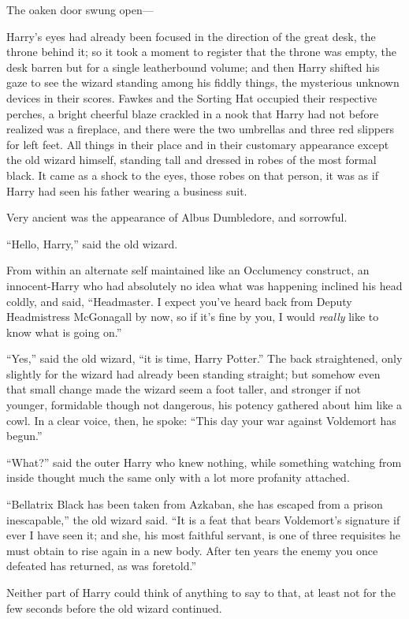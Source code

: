 The oaken door swung open—

Harry’s eyes had already been focused in the direction of the great desk, the throne behind it; so it took a moment to register that the throne was empty, the desk barren but for a single leatherbound volume; and then Harry shifted his gaze to see the wizard standing among his fiddly things, the mysterious unknown devices in their scores. Fawkes and the Sorting Hat occupied their respective perches, a bright cheerful blaze crackled in a nook that Harry had not before realized was a fireplace, and there were the two umbrellas and three red slippers for left feet. All things in their place and in their customary appearance except the old wizard himself, standing tall and dressed in robes of the most formal black. It came as a shock to the eyes, those robes on that person, it was as if Harry had seen his father wearing a business suit.

Very ancient was the appearance of Albus Dumbledore, and sorrowful.

“Hello, Harry,” said the old wizard.

From within an alternate self maintained like an Occlumency construct, an innocent-Harry who had absolutely no idea what was happening inclined his head coldly, and said, “Headmaster. I expect you’ve heard back from Deputy Headmistress McGonagall by now, so if it’s fine by you, I would \emph{really} like to know what is going on.”

“Yes,” said the old wizard, “it is time, Harry Potter.” The back straightened, only slightly for the wizard had already been standing straight; but somehow even that small change made the wizard seem a foot taller, and stronger if not younger, formidable though not dangerous, his potency gathered about him like a cowl. In a clear voice, then, he spoke: “This day your war against Voldemort has begun.”

“What?” said the outer Harry who knew nothing, while something watching from inside thought much the same only with a lot more profanity attached.

“Bellatrix Black has been taken from Azkaban, she has escaped from a prison inescapable,” the old wizard said. “It is a feat that bears Voldemort’s signature if ever I have seen it; and she, his most faithful servant, is one of three requisites he must obtain to rise again in a new body. After ten years the enemy you once defeated has returned, as was foretold.”

Neither part of Harry could think of anything to say to that, at least not for the few seconds before the old wizard continued.

